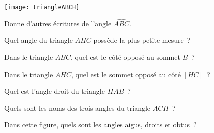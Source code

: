 \begin{activite}

\texttt{[image: triangleABCH]}

\begin{partie}
Donne d'autres écritures de l'angle $\widehat{ABC}$.
\end{partie}

\begin{partie}
Quel angle du triangle $AHC$ possède la plus petite mesure ?
\end{partie}

\begin{partie}
Dans le triangle $ABC$, quel est le côté opposé au sommet $B$ ?
\end{partie}

\begin{partie}
Dans le triangle $AHC$, quel est le sommet opposé au côté $[HC]$ ?
\end{partie}

\begin{partie}
Quel est l'angle droit du triangle $HAB$ ?
\end{partie}

\begin{partie}
Quels sont les noms des trois angles du triangle $ACH$ ?
\end{partie}

\begin{partie}
Dans cette figure, quels sont les angles aigus, droits et obtus ?
\end{partie}

\end{activite}



